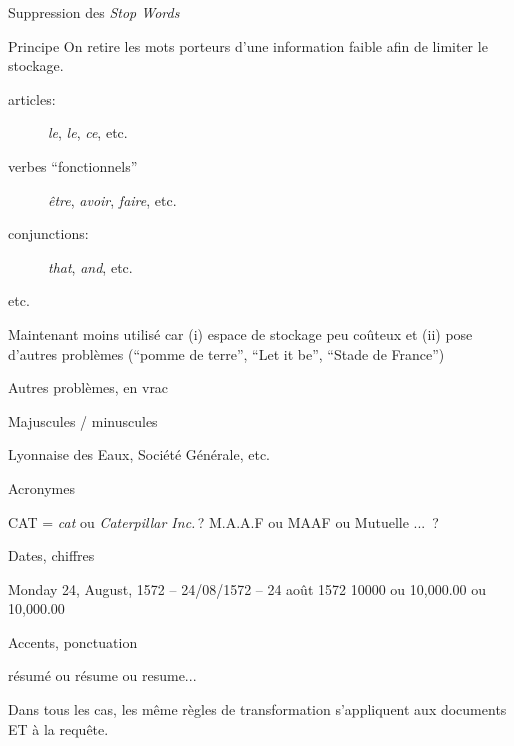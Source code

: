 \begin{frame}{Suppression des \textit{Stop Words}}

\begin{beamerboxesrounded}{Principe}
On retire les mots porteurs d'une information faible afin de limiter le stockage.
\end{beamerboxesrounded}

\begin{description}
\item[articles:] \emph{le}, \emph{le}, \emph{ce}, etc.

\item[verbes ``fonctionnels''] \emph{être}, \emph{avoir}, \emph{faire}, etc.

\item[conjunctions:] \emph{that}, \emph{and}, etc.

\item[etc.]
\end{description}

\begin{remark}
Maintenant moins utilisé car (i) espace de stockage peu coûteux et (ii) pose d'autres problèmes (``pomme de terre'',
``Let it be'', ``Stade de France'')
\end{remark}

\end{frame}



\begin{frame}{Autres problèmes, en vrac}


\alert{Majuscules / minuscules}

Lyonnaise des Eaux, Société Générale, etc.

\vfill
 \alert{Acronymes}
 
   CAT = \textit{cat} ou \textit{Caterpillar Inc.}\,?  M.A.A.F ou MAAF ou Mutuelle ... \,?

\vfill

\alert{Dates, chiffres}

   Monday 24, August, 1572 -- 24/08/1572 -- 24 août 1572
    10000 ou 10,000.00 ou 10,000.00
     
     
     \vfill
     
     \alert{Accents, ponctuation}
     
     résumé ou résume ou resume... 
     
 \begin{remark}
 Dans tous les cas, les même règles de transformation s'appliquent aux documents ET à la requête.
 \end{remark}
 \end{frame}


